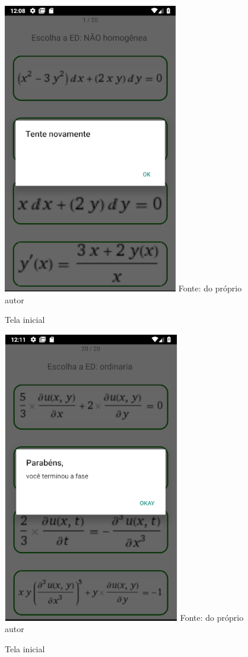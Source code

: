 \begin{figure}[H]
\centering
\caption{Tela inicial}
\includegraphics[scale=0.72]{figuras/tente_novamente.png}
\small{Fonte: do próprio autor}
\end{figure}

\begin{figure}[H]
\centering
\caption{Tela inicial}
\includegraphics[scale=0.72]{figuras/fim_fase.png}
\small{Fonte: do próprio autor}
\end{figure}

